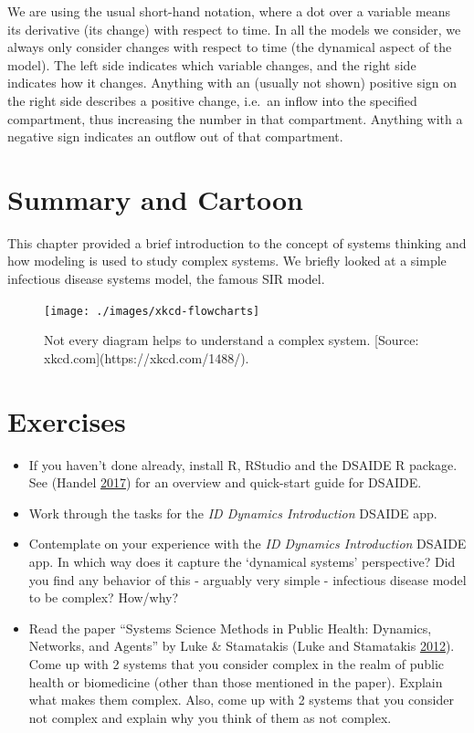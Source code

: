 \documentclass[
]{book}
\providecommand{\tightlist}{%
  \setlength{\itemsep}{0pt}\setlength{\parskip}{0pt}}
\begin{document}
We are using the usual short-hand notation, where a dot over a variable means its derivative (its change) with respect to time. In all the models we consider, we always only consider changes with respect to time (the dynamical aspect of the model). The left side indicates which variable changes, and the right side indicates how it changes. Anything with an (usually not shown) positive sign on the right side describes a positive change, i.e.~an inflow into the specified compartment, thus increasing the number in that compartment. Anything with a negative sign indicates an outflow out of that compartment.

\hypertarget{summary-and-cartoon}{%
\section{Summary and Cartoon}\label{summary-and-cartoon}}

This chapter provided a brief introduction to the concept of systems thinking and how modeling is used to study complex systems. We briefly looked at a simple infectious disease systems model, the famous SIR model.

\begin{figure}
\texttt{[image: ./images/xkcd-flowcharts]} \caption{Not every diagram helps to understand a complex system. [Source: xkcd.com](https://xkcd.com/1488/).}\label{fig:complexcartoon}
\end{figure}

\hypertarget{exercises}{%
\section{Exercises}\label{exercises}}

\begin{itemize}
\tightlist
\item
  If you haven't done already, install R, RStudio and the DSAIDE R package. See (Handel \protect\hyperlink{ref-handel17}{2017}) for an overview and quick-start guide for DSAIDE.
\item
  Work through the tasks for the \emph{ID Dynamics Introduction} DSAIDE app.
\item
  Contemplate on your experience with the \emph{ID Dynamics Introduction} DSAIDE app. In which way does it capture the `dynamical systems' perspective? Did you find any behavior of this - arguably very simple - infectious disease model to be complex? How/why?
\item
  Read the paper ``Systems Science Methods in Public Health: Dynamics, Networks, and Agents'' by Luke \& Stamatakis (Luke and Stamatakis \protect\hyperlink{ref-luke12}{2012}). Come up with 2 systems that you consider complex in the realm of public health or biomedicine (other than those mentioned in the paper). Explain what makes them complex. Also, come up with 2 systems that you consider not complex and explain why you think of them as not complex.
\end{itemize}
\end{document}
